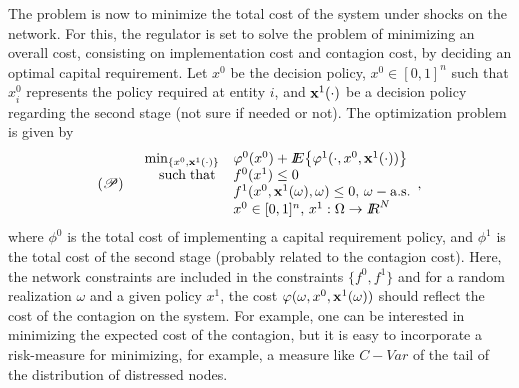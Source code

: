 \documentclass[12pt,letterpaper]{article}
\begin{document}
The problem is now to minimize the total cost of the system under shocks on the network.  For this, the regulator is set to solve the problem of minimizing an overall cost, consisting on implementation cost and contagion cost, by deciding an optimal capital requirement.  Let $x^0$ be the decision policy, $x^0\in[0,1]^n$ such that $x^0_i$ represents the policy required at entity $i$, and ${\bf x}^1(\cdot)$ be a decision policy regarding the second stage (not sure if needed or not).  The optimization problem is given by
\[(\rsP)\quad \begin{array}{rl}\min_{\{x^0,{\bf x}^1(\cdot)\}}&\phi^0(x^0)+\Ex\lset \phi^1(\cdot,x^0,{\bf x}^1(\cdot))\rset\\
\suchthat&f^0(x^1)\leq 0 \\
&f^1(x^0,{\bf x}^1(\omega),\omega)\leq 0,\,\omega-\as\\
&x^0\in[0,1]^n,\,x^1:\Omega\to\reals^N\end{array},\]
where $\phi^0$ is the total cost of implementing a capital requirement policy, and $\phi^1$ is the total cost of the second stage (probably related to the contagion cost). Here, the network constraints are included in the constraints $\{f^0,f^1\}$ and for a random realization $\omega$ and a given policy $x^1$, the cost $\phi(\omega,x^0,{\bf x}^1(\omega))$ should reflect the cost of the contagion on the system. For example, one can be interested in minimizing the expected cost of the contagion, but it is easy to incorporate a risk-measure for minimizing, for example, a measure like $C-Var$ of the tail of the distribution of distressed nodes.










\newpage



\end{document}
